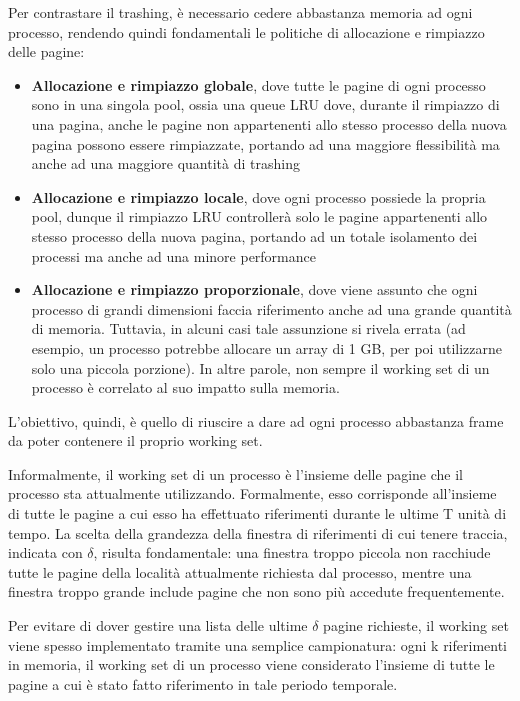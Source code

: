 \documentclass{article}
\begin{document}
Per contrastare il trashing, è necessario cedere abbastanza memoria ad ogni processo, rendendo quindi fondamentali le politiche di allocazione e rimpiazzo delle pagine:
\begin{itemize}
    \item \textbf{Allocazione e rimpiazzo globale}, dove tutte le pagine di ogni processo sono in una singola pool, ossia una queue LRU dove, durante il rimpiazzo di una pagina, anche le pagine non appartenenti allo stesso processo della nuova pagina possono essere rimpiazzate, portando ad una maggiore flessibilità ma anche ad una maggiore quantità di trashing
    \item \textbf{Allocazione e rimpiazzo locale}, dove ogni processo possiede la propria pool, dunque il rimpiazzo LRU controllerà solo le pagine appartenenti allo stesso processo della nuova pagina, portando ad un totale isolamento dei processi ma anche ad una minore performance
    \item \textbf{Allocazione e rimpiazzo proporzionale}, dove viene assunto che ogni processo di grandi dimensioni faccia riferimento anche ad una grande quantità di memoria. Tuttavia, in alcuni casi tale assunzione si rivela errata (ad esempio, un processo potrebbe allocare un array di 1 GB, per poi utilizzarne solo una piccola porzione). In altre parole, non sempre il working set di un processo è correlato al suo impatto sulla memoria.
\end{itemize}
L'obiettivo, quindi, è quello di riuscire a dare ad ogni processo abbastanza frame da poter contenere il proprio working set.

Informalmente, il working set di un processo è l'insieme delle pagine che il processo sta attualmente utilizzando. Formalmente, esso corrisponde all'insieme di tutte le pagine a cui esso ha effettuato riferimenti durante le ultime T unità di tempo.
La scelta della grandezza della finestra di riferimenti di cui tenere traccia, indicata con $\delta$, risulta fondamentale: una finestra troppo piccola non racchiude tutte le pagine della località attualmente richiesta dal processo, mentre una finestra troppo grande include pagine che non sono più accedute frequentemente.\par
Per evitare di dover gestire una lista delle ultime $\delta$ pagine richieste, il working set viene spesso implementato tramite una semplice campionatura: ogni k riferimenti in memoria, il working set di un processo viene considerato l'insieme di tutte le pagine a cui è stato fatto riferimento in tale periodo temporale.
\end{document}
